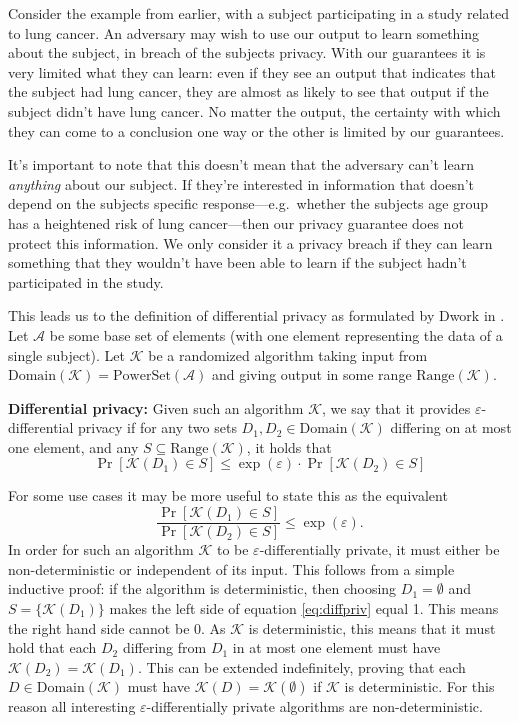 \documentclass[a4paper,12pt]{article}
\newcommand{\fancy}{\mathcal}
\renewcommand{\epsilon}{\varepsilon}
\begin{document}
Consider the example from earlier, with a subject participating in a study related to lung cancer. An adversary may wish to use our output to learn something about the subject, in breach of the subjects privacy. With our guarantees it is very limited what they can learn: even if they see an output that indicates that the subject had lung cancer, they are almost as likely to see that output if the subject didn't have lung cancer. No matter the output, the certainty with which they can come to a conclusion one way or the other is limited by our guarantees.

It's important to note that this doesn't mean that the adversary can't learn \emph{anything} about our subject. If they're interested in information that doesn't depend on the subjects specific response---e.g.\ whether the subjects age group has a heightened risk of lung cancer---then our privacy guarantee does not protect this information. We only consider it a privacy breach if they can learn something that they wouldn't have been able to learn if the subject hadn't participated in the study. 


This leads us to the definition of differential privacy as formulated by Dwork in \cite{dwork2006_diffpriv}. Let $\fancy{A}$ be some base set of elements (with one element representing the data of a single subject). Let $\fancy{K}$ be a randomized algorithm taking input from $\text{Domain}(\fancy{K})=\text{PowerSet}(\fancy{A})$ and giving output in some range $\text{Range}(\fancy{K})$.

\begin{mdframed}
    \textbf{Differential privacy:} Given such an algorithm $\fancy{K}$, we say that it provides $\epsilon$-differential privacy if for any two sets $D_1,D_2 \in \text{Domain}(\fancy{K})$ differing on at most one element, and any $S \subseteq \text{Range}(\fancy{K})$, it holds that
    \begin{equation}\label{eq:diffpriv}
        \Pr[\fancy{K}(D_1) \in S] \leq \exp(\epsilon) \cdot \Pr[\fancy{K}(D_2) \in S]
    \end{equation}
\end{mdframed}

For some use cases it may be more useful to state this as the equivalent
\begin{equation*}
    \frac{\Pr[\fancy{K}(D_1) \in S]}{\Pr[\fancy{K}(D_2) \in S]} \leq \exp(\epsilon).
\end{equation*}
In order for such an algorithm $\fancy{K}$ to be $\epsilon$-differentially private, it must either be non-deterministic or independent of its input. This follows from a simple inductive proof: if the algorithm is deterministic, then choosing $D_1=\emptyset$ and $S=\{ \fancy{K}(D_1) \}$ makes the left side of equation \ref{eq:diffpriv} equal 1. This means the right hand side cannot be 0. As $\fancy{K}$ is deterministic, this means that it must hold that each $D_2$ differing from $D_1$ in at most one element must have $\fancy{K}(D_2)=\fancy{K}(D_1)$. This can be extended indefinitely, proving that each $D \in \text{Domain}(\fancy{K})$ must have $\fancy{K}(D)=\fancy{K}(\emptyset)$ if $\fancy{K}$ is deterministic. For this reason all interesting $\epsilon$-differentially private algorithms are non-deterministic. 
\end{document}
